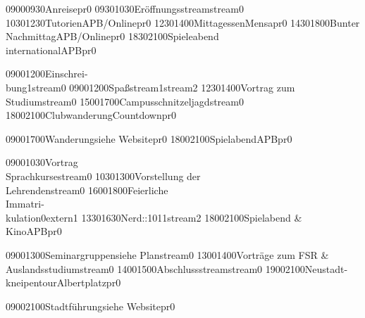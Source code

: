 \documentclass[a5paper,7pt]{scrreprt}
\begin{document}
\thispagestyle{empty}

\setslotsize{3.00cm}{0.25cm}
\settextframe{0.8mm}

\seteventcornerradius{0pt}




\begin{center}
\begin{timetable}
   {0900}{0930}{Anreise}{}{}{}{pr}{0}
   {0930}{1030}{Eröffnungsstream}{}{}{}{stream}{0}
   {1030}{1230}{Tutorien}{}{APB/Online}{}{pr}{0}
   {1230}{1400}{Mittagessen}{}{Mensa}{}{pr}{0}
   {1430}{1800}{Bunter Nachmittag}{}{APB/Online}{}{pr}{0}
   {1830}{2100}{Spieleabend\\international}{}{APB}{}{pr}{0}


   {0900}{1200}{Einschrei-\\bung}{}{}{1}{stream}{0}
   {0900}{1200}{Spaßstream}{}{}{1}{stream}{2}
   {1230}{1400}{Vortrag zum Studium}{}{}{}{stream}{0}
   {1500}{1700}{Campusschnitzeljagd}{}{}{}{stream}{0}
   {1800}{2100}{Clubwanderung}{}{Countdown}{}{pr}{0}

   {0900}{1700}{Wanderung}{}{siehe Website}{}{pr}{0}
   {1800}{2100}{Spielabend}{}{APB}{}{pr}{0}


   {0900}{1030}{Vortrag\\Sprachkurse}{}{}{}{stream}{0}
   {1030}{1300}{Vorstellung der\\Lehrenden}{}{}{}{stream}{0}
   {1600}{1800}{Feierliche\\Immatri-\\kulation}{}{}{0}{extern}{1}
   {1330}{1630}{Nerd::101}{}{}{1}{stream}{2}
   {1800}{2100}{Spielabend \&\\Kino}{}{APB}{}{pr}{0}

   {0900}{1300}{Seminargruppen}{}{siehe Plan}{}{stream}{0}
   {1300}{1400}{Vorträge zum FSR \&\\Auslandsstudium}{}{}{}{stream}{0}
   {1400}{1500}{Abschlussstream}{}{}{}{stream}{0}
   {1900}{2100}{Neustadt-\\kneipentour}{}{Albertplatz}{}{pr}{0}
  
   {0900}{2100}{Stadtführung}{}{siehe Website}{}{pr}{0}
\end{timetable}
\end{center}
\end{document}
